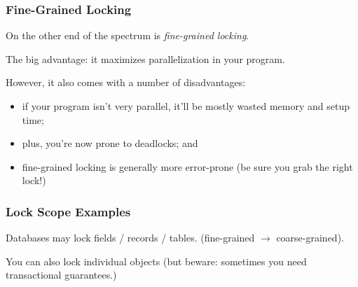 \begin{frame}
\frametitle{Fine-Grained Locking}

On the other end of the spectrum is \emph{fine-grained locking}. 

The big
advantage: it maximizes parallelization in your program.

However, it also comes with a number of disadvantages:
  \begin{itemize}
    \item if your program isn't very parallel, it'll be mostly wasted memory and setup time;
    \item plus, you're now prone to deadlocks; and
    \item fine-grained locking is generally more error-prone (be sure you grab the right lock!)
  \end{itemize}

\end{frame}

\begin{frame}
\frametitle{Lock Scope Examples}


    Databases may lock fields / records / tables. (fine-grained $\rightarrow$ coarse-grained).

    You can also lock individual objects (but beware: sometimes you need transactional guarantees.)



\end{frame}








